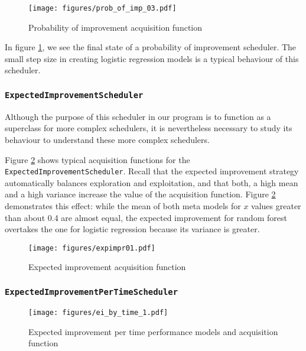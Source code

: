 \documentclass[a4paper,12pt,twoside,openright]{report}
\begin{document}
\begin{figure}
\centering
  \texttt{[image: figures/prob\_of\_imp\_03.pdf]}
  \caption{Probability of improvement acquisition function}
  \label{sched:probofimpr3}
\end{figure}

In figure \ref{sched:probofimpr3}, we see the final state of a probability of improvement scheduler. The small step size in creating logistic regression models is a typical behaviour of this scheduler. 

\subsubsection{\texttt{ExpectedImprovementScheduler}}

Although the purpose of this scheduler in our program is to function as a superclass for more complex schedulers, it is nevertheless necessary to study its behaviour to understand these more complex schedulers.


Figure \ref{sched:expimpr01} shows typical acquisition functions for the \texttt{ExpectedImprovementScheduler}. Recall that the expected improvement strategy automatically balances exploration and exploitation, and that both, a high mean and a high variance increase the value of the acquisition function. Figure \ref{sched:expimpr01} demonstrates this effect: while the mean of both meta models for $x$ values greater than about 0.4 are almost equal, the expected improvement for random forest overtakes the one for logistic regression because its variance is greater.

\begin{figure}
\centering
  \texttt{[image: figures/expimpr01.pdf]}
  \caption{Expected improvement acquisition function}
  \label{sched:expimpr01}
\end{figure}



\subsubsection{\texttt{ExpectedImprovementPerTimeScheduler}}
\begin{figure}
\centering
  \texttt{[image: figures/ei\_by\_time\_1.pdf]}
  \caption{Expected improvement per time performance models and acquisition function}
  \label{sched:expimprpertime01}
\end{figure}
\end{document}
